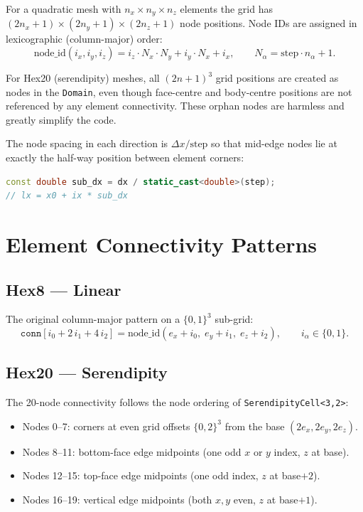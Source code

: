 \noindent For a quadratic mesh with $n_x \times n_y \times n_z$ elements
the grid has $(2n_x + 1) \times (2n_y + 1) \times (2n_z + 1)$ node
positions.  Node IDs are assigned in lexicographic (column-major) order:
%
\begin{equation}
  \text{node\_id}(i_x, i_y, i_z)
  = i_z \cdot N_x \cdot N_y + i_y \cdot N_x + i_x,
  \qquad
  N_\alpha = \text{step} \cdot n_\alpha + 1.
  \label{eq:ho-node-id}
\end{equation}

For Hex20 (serendipity) meshes, all $(2n+1)^3$ grid positions are
created as nodes in the \texttt{Domain}, even though face-centre and
body-centre positions are not referenced by any element connectivity.
These orphan nodes are harmless and greatly simplify the code.

The node spacing in each direction is $\Delta x / \text{step}$ so that
mid-edge nodes lie at exactly the half-way position between element
corners:

\begin{lstlisting}[language=C++, basicstyle=\ttfamily\small]
const double sub_dx = dx / static_cast<double>(step);
// lx = x0 + ix * sub_dx
\end{lstlisting}


\section{Element Connectivity Patterns}
\label{sec:ho-connectivity}

\subsection{Hex8 — Linear}

The original column-major pattern on a $\{0,1\}^3$ sub-grid:
%
\begin{equation}
  \texttt{conn}[i_0 + 2\,i_1 + 4\,i_2]
  = \text{node\_id}(e_x + i_0,\; e_y + i_1,\; e_z + i_2),
  \qquad i_\alpha \in \{0,1\}.
\end{equation}

\subsection{Hex20 — Serendipity}

The 20-node connectivity follows the node ordering of
\texttt{SerendipityCell<3,2>}:

\begin{itemize}
  \item Nodes 0--7: corners at even grid offsets
        $\{0,2\}^3$ from the base $(2e_x, 2e_y, 2e_z)$.
  \item Nodes 8--11: bottom-face edge midpoints (one odd $x$ or $y$
        index, $z$ at base).
  \item Nodes 12--15: top-face edge midpoints (one odd index,
        $z$ at base$+2$).
  \item Nodes 16--19: vertical edge midpoints (both $x,y$ even,
        $z$ at base$+1$).
\end{itemize}

